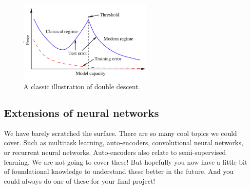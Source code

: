 \begin{figure}
\centering 
\includegraphics[width=0.6\textwidth]{442_lecs/dd.png}
\caption{A classic illustration of double descent.}	
\label{fig_dd}
\end{figure}





\subsection{Extensions of neural networks}

We have barely scratched the surface. There are so many cool topics we could cover. Such as multitask learning, auto-encoders, convolutional neural networks, or recurrent neural networks. Auto-encoders also relate to semi-supervised learning. We are not going to cover these! But hopefully you now have a little bit of foundational knowledge to understand these better in the future. And you could always do one of these for your final project!




